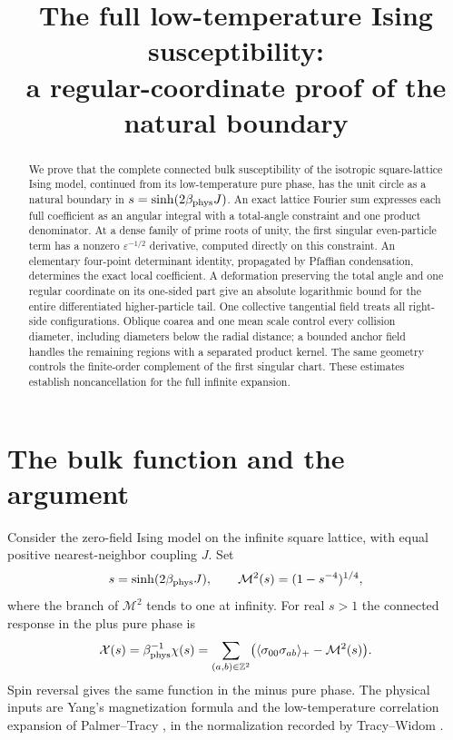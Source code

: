 \documentclass[11pt]{article}
\title{The full low-temperature Ising susceptibility:\\ a regular-coordinate proof of the natural boundary}
\author{}
\date{}
\numberwithin{equation}{section}
\theoremstyle{remark}\newtheorem{remark}[theorem]{Remark}
\newcommand{\X}{\mathcal X}
\newcommand{\Mtwo}{\mathcal M^2}
\begin{document}
\maketitle

\begin{abstract}
We prove that the complete connected bulk susceptibility of the
isotropic square-lattice Ising model, continued from its low-temperature
pure phase, has the unit circle as a natural boundary in
$s=\sinh(2\beta_{\rm phys}J)$. An exact lattice Fourier sum expresses
each full coefficient as an angular integral with a total-angle
constraint and one product denominator. At a dense family of prime
roots of unity, the first singular even-particle term has a nonzero
$\varepsilon^{-1/2}$ derivative, computed directly on this constraint.
An elementary four-point determinant identity, propagated by
Pfaffian condensation, determines the exact local coefficient. A deformation preserving the total angle and one regular
coordinate on its one-sided part give
an absolute logarithmic bound for the entire differentiated
higher-particle tail. One collective tangential field treats all right-side configurations.
Oblique coarea and one mean scale control every collision diameter,
including diameters below the radial distance; a bounded anchor
field handles the remaining regions with a separated product kernel. The same geometry
controls the finite-order complement of the first singular chart. These estimates establish
noncancellation for the full infinite expansion.
\end{abstract}

\section{The bulk function and the argument}

Consider the zero-field Ising model on the infinite square lattice,
with equal positive nearest-neighbor coupling $J$. Set
\[
 s=\sinh(2\beta_{\rm phys}J),\qquad
 \Mtwo(s)=(1-s^{-4})^{1/4},
\]
where the branch of $\Mtwo$ tends to one at infinity.
For real $s>1$ the connected response in the plus pure phase is
\begin{equation}\label{eq:physical}
 \X(s)=\beta_{\rm phys}^{-1}\chi(s)
 =\sum_{(a,b)\in\mathbb Z^2}
       \bigl(\langle\sigma_{00}\sigma_{ab}\rangle_+
                     -\Mtwo(s)\bigr).
\end{equation}
Spin reversal gives the same function in the minus pure phase.
The physical inputs are Yang's magnetization formula and the
low-temperature correlation expansion of Palmer--Tracy
\cite{Yang,PalmerTracy}, in the normalization recorded by
Tracy--Widom \cite[Appendix 1, pp.~1132--1133]{TracyWidom}.
\end{document}
